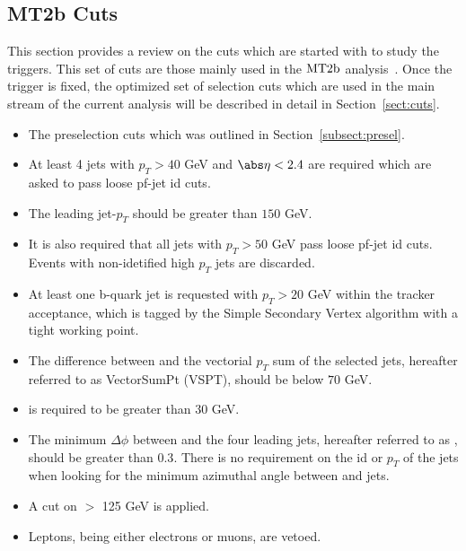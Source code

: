 \subsection{MT2b Cuts}
\label{subsect:mt2bcuts}
This section provides a review on the cuts which are started with to study the triggers. This set of cuts are those mainly used in the $\rm MT2b$ analysis~\cite{MT2_2011}. Once the trigger is fixed, the optimized set of selection cuts which are used in the main stream of the current analysis will be described in detail in Section~\ref{sect:cuts}.
\begin{itemize}
\item The preselection cuts which was outlined in Section~\ref{subsect:presel}.
\item At least 4 jets with $p_T>40$ GeV and $\abs\eta<2.4$ are required which are asked to pass loose pf-jet id cuts.
\item The leading jet-$p_T$ should be greater than $150$ GeV.
\item It is also required that all jets with $p_T>50$ GeV pass loose pf-jet id cuts. Events with non-idetified high $p_T$ jets are discarded.
\item At least one b-quark jet is requested with $p_T>20$ GeV within the tracker acceptance, which is tagged by the Simple Secondary Vertex algorithm with a tight working point.
\item The difference between \met and the vectorial $p_T$ sum of the selected jets, hereafter referred to as VectorSumPt (VSPT), should be below $70$ GeV.
\item \met is required to be greater than $30$ GeV.
\item The minimum $\Delta\phi$ between \met and the four leading jets, hereafter referred to as \mindphifour, should be greater than $0.3$. There is no requirement on the id or $p_T$ of the jets when looking for the minimum azimuthal angle between \met and jets.
\item A cut on \mttwo $>$ 125 GeV is applied.
\item Leptons, being either electrons or muons, are vetoed.
\end{itemize}


